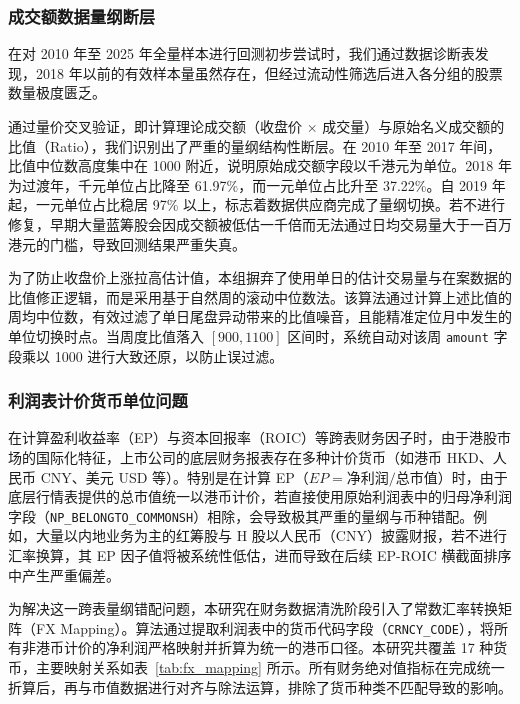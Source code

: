 \documentclass[a4paper,10pt]{article}
\begin{document}
\subsubsection{成交额数据量纲断层}

在对 2010 年至 2025 年全量样本进行回测初步尝试时，我们通过数据诊断表发现，2018 年以前的有效样本量虽然存在，但经过流动性筛选后进入各分组的股票数量极度匮乏。

通过量价交叉验证，即计算理论成交额（收盘价 $\times$ 成交量）与原始名义成交额的比值（Ratio），我们识别出了严重的量纲结构性断层。在 2010 年至 2017 年间，比值中位数高度集中在 1000 附近，说明原始成交额字段以千港元为单位。2018 年为过渡年，千元单位占比降至 61.97\%，而一元单位占比升至 37.22\%。自 2019 年起，一元单位占比稳居 97\% 以上，标志着数据供应商完成了量纲切换。若不进行修复，早期大量蓝筹股会因成交额被低估一千倍而无法通过日均交易量大于一百万港元的门槛，导致回测结果严重失真。

为了防止收盘价上涨拉高估计值，本组摒弃了使用单日的估计交易量与在案数据的比值修正逻辑，而是采用基于自然周的滚动中位数法。该算法通过计算上述比值的周均中位数，有效过滤了单日尾盘异动带来的比值噪音，且能精准定位月中发生的单位切换时点。当周度比值落入 $[900, 1100]$ 区间时，系统自动对该周 \texttt{amount} 字段乘以 1000 进行大致还原，以防止误过滤。

\subsubsection{利润表计价货币单位问题}

在计算盈利收益率（EP）与资本回报率（ROIC）等跨表财务因子时，由于港股市场的国际化特征，上市公司的底层财务报表存在多种计价货币（如港币 HKD、人民币 CNY、美元 USD 等）。特别是在计算 EP（$EP = \text{净利润} / \text{总市值}$）时，由于底层行情表提供的总市值统一以港币计价，若直接使用原始利润表中的归母净利润字段（\texttt{NP\_BELONGTO\_COMMONSH}）相除，会导致极其严重的量纲与币种错配。例如，大量以内地业务为主的红筹股与 H 股以人民币（CNY）披露财报，若不进行汇率换算，其 EP 因子值将被系统性低估，进而导致在后续 EP-ROIC 横截面排序中产生严重偏差。

为解决这一跨表量纲错配问题，本研究在财务数据清洗阶段引入了常数汇率转换矩阵（FX Mapping）。算法通过提取利润表中的货币代码字段（\texttt{CRNCY\_CODE}），将所有非港币计价的净利润严格映射并折算为统一的港币口径。本研究共覆盖 17 种货币，主要映射关系如表~\ref{tab:fx_mapping} 所示。所有财务绝对值指标在完成统一折算后，再与市值数据进行对齐与除法运算，排除了货币种类不匹配导致的影响。
\end{document}
